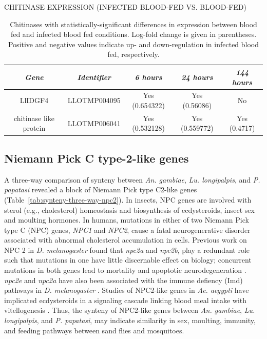 \begin{table}[H]
  \centering
  \caption{CHITINASE EXPRESSION (INFECTED BLOOD-FED VS. BLOOD-FED)}
  \begin{tabular}{ c c c c c } \hline
    \emph{Gene} & \emph{Identifier} & \emph{6 hours} & \emph{24 hours} & \emph{144 hours} \\ \hline
    LlIDGF4 & LLOTMP004095 & Yes (0.654322) & Yes (0.56086) & No \\
    chitinase like protein & LLOTMP006041 & Yes (0.532128) & Yes (0.559772) & Yes (0.4717)
  \end{tabular}
  \caption*{Chitinases with statistically-significant differences in expression between blood fed and infected blood fed conditions. Log-fold change is given in parentheses. Positive and negative values indicate up- and down-regulation in infected blood fed, respectively.}
  \label{tab:sandflies:stat-sig-chitinases-bi}
\end{table}


\subsection{Niemann Pick C type-2-like genes}
A three-way comparison of synteny between \emph{An. gambiae}, \emph{Lu. longipalpis}, and \emph{P. papatasi} revealed a block of Niemann Pick type C2-like genes (Table~\ref{tab:synteny-three-way-npc2}). In insects, NPC genes are involved with sterol (e.g., cholesterol) homeostasis and biosynthesis of ecdysteroids, insect sex and moulting hormones. In humans, mutations in either of two Niemann Pick type C (NPC) genes, \emph{NPC1} and \emph{NPC2}, cause a fatal neurogenerative disorder associated with abnormal cholesterol accumulation in cells.  Previous work on NPC 2 in \emph{D. melanogaster} found that \emph{npc2a} and \emph{npc2b}, play a redundant role such that mutations in one have little discernable effect on biology; concurrent mutations in both genes lead to mortality and apoptotic neurodegeneration \cite{Huang2007}.  \emph{npc2e} and \emph{npc2a} have also been associated with the immune defiency (Imd) pathways in \emph{D. melanogaster} \cite{Shi2012}. Studies of NPC2-like genes in \emph{Ae. aegypti} have implicated ecdysteroids in a signaling cascade linking blood meal intake with vitellogenesis \cite{Sirot2011}.  Thus, the synteny of NPC2-like genes between \emph{An. gambiae}, \emph{Lu. longipalpis}, and \emph{P. papatasi}, may indicate similarity in sex, moulting, immunity, and feeding pathways between sand flies and mosquitoes.

